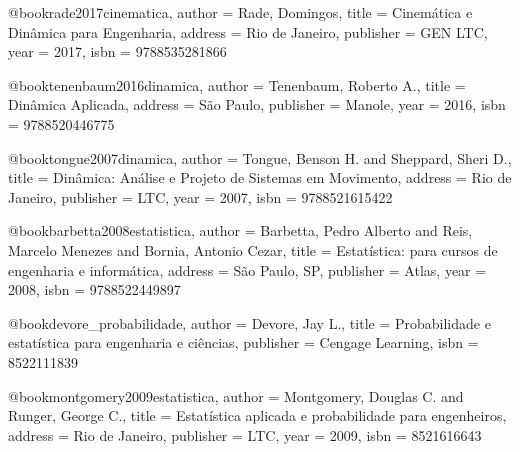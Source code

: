 @book{rade2017cinematica,
  author = {Rade, Domingos},
  title = {Cinemática e Dinâmica para Engenharia},
  address = {Rio de Janeiro},
  publisher = {GEN LTC},
  year = {2017},
  isbn = {9788535281866}
}

@book{tenenbaum2016dinamica,
  author = {Tenenbaum, Roberto A.},
  title = {Dinâmica Aplicada},
  address = {São Paulo},
  publisher = {Manole},
  year = {2016},
  isbn = {9788520446775}
}

@book{tongue2007dinamica,
  author = {Tongue, Benson H. and Sheppard, Sheri D.},
  title = {Dinâmica: Análise e Projeto de Sistemas em Movimento},
  address = {Rio de Janeiro},
  publisher = {LTC},
  year = {2007},
  isbn = {9788521615422}
}

%

@book{barbetta2008estatistica,
  author = {Barbetta, Pedro Alberto and Reis, Marcelo Menezes and Bornia, Antonio Cezar},
  title = {Estatística: para cursos de engenharia e informática},
  address = {São Paulo, SP},
  publisher = {Atlas},
  year = {2008},
  isbn = {9788522449897}
}

@book{devore_probabilidade,
  author = {Devore, Jay L.},
  title = {Probabilidade e estatística para engenharia e ciências},
  publisher = {Cengage Learning},
  isbn = {8522111839}%
}

@book{montgomery2009estatistica,
  author = {Montgomery, Douglas C. and Runger, George C.},
  title = {Estatística aplicada e probabilidade para engenheiros},
  address = {Rio de Janeiro},
  publisher = {LTC},
  year = {2009},
  isbn = {8521616643}%
}

